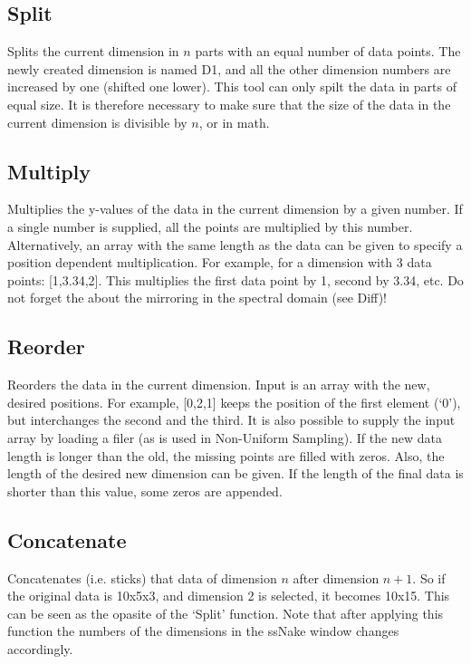 \documentclass[11pt,a4paper]{article}
\begin{document}
\subsection{Split}
Splits the current dimension in $n$ parts with an equal number of data points. The newly created dimension is named D1, and all the other dimension numbers are increased by one (shifted one lower). This tool can only spilt the data in parts of equal size. It is therefore necessary to make sure that the size of the data in the current dimension is divisible by $n$, or in math.

\subsection{Multiply}
Multiplies the y-values of the data in the current dimension by a given number. If a single number is supplied, all the points are multiplied by this number. Alternatively, an array with the same length as the data can be given to specify a position dependent multiplication. For example, for a dimension with 3 data points: [1,3.34,2]. This multiplies the first data point by 1, second by 3.34, etc. Do not forget the about the mirroring in the spectral domain (see Diff)!

\subsection{Reorder}
Reorders the data in the current dimension. Input is an array with the new, desired positions. For example, [0,2,1] keeps the position of the first element (`0'), but interchanges the second and the third. It is also possible to supply the input array by loading a filer (as is used in Non-Uniform Sampling). If the new data length is longer than the old, the missing points are filled with zeros. Also, the length of the desired new dimension can be given. If the length of the final data is shorter than this value, some zeros are appended.

\subsection{Concatenate}
Concatenates (i.e. sticks) that data of dimension $n$ after dimension $n+1$. So if the original data is 10x5x3, and dimension 2 is selected, it becomes 10x15. This can be seen as the opasite of the `Split' function. Note that after applying this function the numbers of the dimensions in the ssNake window changes accordingly.
\end{document}
